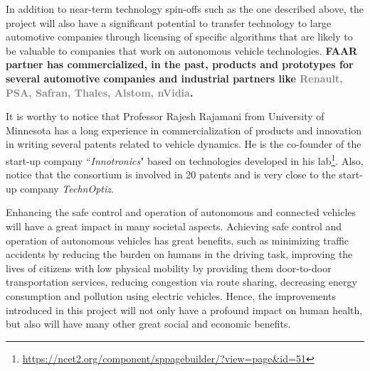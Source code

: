 \documentclass[a4paper,11pt]{article}
\begin{document}
In addition to near-term technology spin-offs such as the one described above, the project will also have a significant potential to transfer technology to large automotive companies through licensing of specific algorithms that are likely to be valuable to companies that work on autonomous vehicle technologies. {\bf FAAR partner has commercialized, in the past, products and prototypes for several automotive companies and industrial partners like \textcolor{gray}{Renault, PSA, Safran, Thales, Alstom, nVidia}.} 

It is worthy to notice that Professor {Rajesh \sc Rajamani} from University of Minnesota has a long experience in commercialization of products and innovation in writing several patents related to vehicle dynamics. He is the co-founder of the start-up company ``{\it Innotronics}" based on technologies developed in his lab\footnote{\url{https://ncet2.org/component/sppagebuilder/?view=page&id=51}}. Also, notice that the consortium is involved in 20 patents and is very close to the start-up company {\it TechnOptiz}.

Enhancing the safe control and operation of autonomous and connected vehicles will have a great impact in many societal aspects. Achieving safe control and operation of autonomous vehicles has great benefits, such as minimizing traffic accidents by reducing the burden on humans in the driving task, improving the lives of citizens with low physical mobility by providing them door-to-door transportation services, reducing congestion via route sharing, decreasing energy consumption and pollution using electric vehicles.  Hence, the improvements introduced in this project will not only have a profound impact on human health, but also will have many other great social and economic benefits.

%
\end{document}
